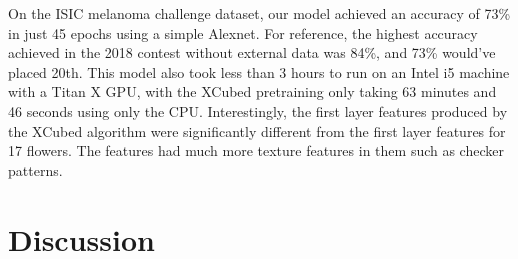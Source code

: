 \documentclass[twocolumn]{article}
\begin{document}
On the ISIC melanoma challenge dataset\cite{melanoma1}\cite{melanoma2}, our model achieved an accuracy of 73\% in just 45 epochs using a simple Alexnet. For reference, the highest accuracy achieved in the 2018 contest without external data was 84\%, and 73\% would've placed 20th. This model also took less than 3 hours to run on an Intel i5 machine with a Titan X GPU, with the XCubed pretraining only taking 63 minutes and 46 seconds using only the CPU. Interestingly, the first layer features produced by the XCubed algorithm were significantly different from the first layer features for 17 flowers. The features had much more texture features in them such as checker patterns.
\section{Discussion}


\end{document}
